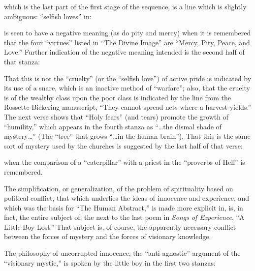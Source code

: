 
\noindent which is the last part of the first stage of the sequence, is a line which is slightly ambiguous: \enquote{selfish loves} in:


\noindent is seen to have a negative meaning (as do pity and mercy) when it is remembered that the four \enquote{virtues} listed in
\enquote{The Divine Image} are \enquote{Mercy, Pity, Peace, and Love.}\supercite{kazin:portable-blake}
Further indication of the negative meaning intended is the second half of that stanza:


That this is not the \enquote{cruelty} (or the \enquote{selfish love}) of active pride is indicated by its use of a snare, which is an
inactive method of \enquote{warfare}; also, that the cruelty is of the wealthy class upon the poor class is indicated by the line from
the Rossette-Bickering manuscript, \enquote{They cannot spread nets where a harvest yields.}\supercite{kazin:portable-blake}
The next verse shows that \enquote{Holy fears} (and tears) promote
the growth of \enquote{humility,} which appears in the fourth stanza as \enquote{\dots the dismal shade of mystery\dots} (The \enquote{tree} that grows \enquote{\dots in the human brain}).
That this is the same sort of mystery used by the churches is suggested by the last half of that verse:


\noindent when the comparison of a \enquote{caterpillar} with a priest in the \enquote{proverbs of Hell}\supercite{kazin:portable-blake}
is remembered.

The simplification, or generalization, of the problem of spirituality based on political conflict, that which underlies
the ideas of innocence and experience, and which was the basis for \enquote{The Human Abstract,} is made more explicit in, is, in fact,
the entire subject of, the next to the last poem in \emph{Songs of Experience}, \enquote{A Little Boy Lost.} That subject is, of course,
the apparently necessary conflict between the forces of mystery and the forces of visionary knowledge.

The philosophy of uncorrupted innocence, the \enquote{anti-agnostic} argument of the \enquote{visionary mystic,} is spoken by the
little boy in the first two stanzas:


